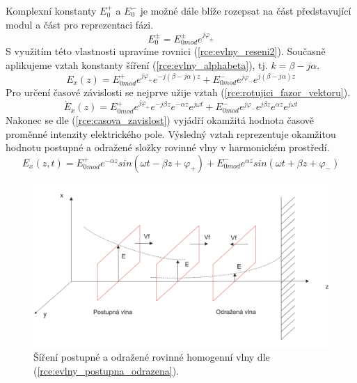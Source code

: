 Komplexní konstanty $E_{0}^{+}$ a $E_{0}^{-}$ je možné dále blíže rozepsat na část představující modul a část pro reprezentaci fázi.
\begin{displaymath}
	E_{0}^{\pm} = E_{0mod}^{\pm}e^{j\varphi_{\pm}}
\end{displaymath}
S využitím této vlastnosti upravíme rovnici (\ref{rce:evlny_reseni2}). Současně aplikujeme vztah konstanty šíření (\ref{rce:evlny_alphabeta}), tj. $k = \beta - j\alpha$.
\begin{displaymath}
	E_{x}(z) = E_{0mod}^{+}e^{j\varphi_{+}}e^{-j(\beta - j\alpha)z} + E_{0mod}^{-}e^{j\varphi_{-}}e^{j(\beta-j\alpha)z}
\end{displaymath}
Pro určení časové závislosti se nejprve užije vztah (\ref{rce:rotujici_fazor_vektoru}).
\begin{displaymath}
	\dot{E}_{x}(z) = E_{0mod}^{+}e^{j\varphi_{+}}e^{-j\beta z}e^{-\alpha z}e^{j\omega t} + E_{0mod}^{-}e^{j\varphi_{-}}e^{j\beta z}e^{\alpha z}e^{j\omega t}
\end{displaymath}
Nakonec se dle (\ref{rce:casova_zavislost}) vyjádří okamžitá hodnota časově proměnné intenzity elektrického pole. Výsledný vztah reprezentuje okamžitou hodnotu postupné a odražené složky rovinné vlny v harmonickém prostředí.
\begin{equation}
	E_{x}(z,t) = E_{0mod}^{+}e^{-\alpha z}sin(\omega t - \beta z + \varphi_{+}) + E_{0mod}^{-}e^{\alpha z}sin(\omega t + \beta z + \varphi_{-})
	\label{rce:evlny_postupna_odrazena}
\end{equation}

\begin{figure}[!h]
	\centering
	\includegraphics[width=14cm]{evlny_postupna_odrazena.png}
	\caption{Šíření postupné a odražené rovinné homogenní vlny dle (\ref{rce:evlny_postupna_odrazena}).}
	\label{obr:evlny_postupna_odrazena}
\end{figure}
